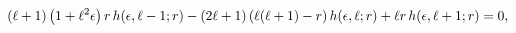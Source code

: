 \[(\ell+1)\left(1+\ell^{2}\epsilon\right)r\mathop{h\/}\nolimits\!\left(\epsilon,%
\ell-1;r\right)-(2\ell+1)\left(\ell(\ell+1)-r\right)\mathop{h\/}\nolimits\!%
\left(\epsilon,\ell;r\right)+\ell r\mathop{h\/}\nolimits\!\left(\epsilon,\ell+%
1;r\right)=0,\]